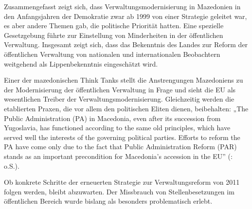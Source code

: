 Zusammengefasst zeigt sich, dass Verwaltungsmodernisierung in Mazedonien in den Anfangsjahren der Demokratie zwar ab 1999 von einer Strategie geleitet war, es aber andere Themen gab, die politische Priorität hatten. Eine spezielle Gesetzgebung führte zur Einstellung von Minderheiten in der öffentlichen Verwaltung. Insgesamt zeigt sich, dass das Bekenntnis des Landes zur Reform der öffentlichen Verwaltung von nationalen und internationalen Beobachtern weitgehend als Lippenbekenntnis eingeschätzt wird.\par
Einer der mazedonischen Think Tanks stellt die Anstrengungen Mazedoniens zu der Modernisierung der öffentlichen Verwaltung in Frage und sieht die EU als wesentlichen Treiber der Verwaltungsmodernisierung. Gleichzeitig werden die etablierten Praxen, die vor allem den politischen Eliten dienen, beibehalten: „The Public Administration (PA) in Macedonia, even after its succession from Yugoslavia, has functioned according to the same old principles, which have served well the interests of the governing political parties. Efforts to reform the PA have come only due to the fact that Public Administration Reform (PAR) stands as an important precondition for Macedonia’s accession in the EU” (\cite{analyt11}:  o.S.).\par
Ob konkrete Schritte der erneuerten Strategie zur Verwaltungsreform von 2011 folgen werden, bleibt abzuwarten. Der Missbrauch von Stellenbesetzungen im öffentlichen Bereich wurde bislang als besonders problematisch erlebt. 


